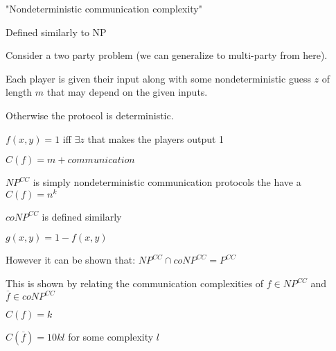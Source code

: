 \documentclass[12pt]{article}
\begin{document}
\maketitle

\par{"Nondeterministic communication complexity"}
\\

\par{Defined similarly to NP}
\\

\par{Consider a two party problem (we can generalize to multi-party from here).}
\\

\par{Each player is given their input along with some nondeterministic guess $z$ of length $m$ that may depend on the
given inputs.}
\\

\par{Otherwise the protocol is deterministic.}
\\

\par{$f(x, y) = 1$ iff $\exists z$ that makes the players output 1}
\\

\par{$C(f) = m + communication$}
\\

\par{$NP^{CC}$ is simply nondeterministic communication protocols the have a $C(f) = n^{k}$}

\par{$coNP^{CC}$ is defined similarly}
\\

\par{$g(x, y) = 1 - f(x, y)$}
\\

\par{However it can be shown that: $NP^{CC} \cap coNP^{CC} = P^{CC}$}
\\

\par{This is shown by relating the communication complexities of $f \in NP^{CC}$ and $\overline{f} \in coNP^{CC}$}
\par{$C(f) = k$}
\par{$C(\overline{f}) = 10kl$ for some complexity $l$}
\end{document}
